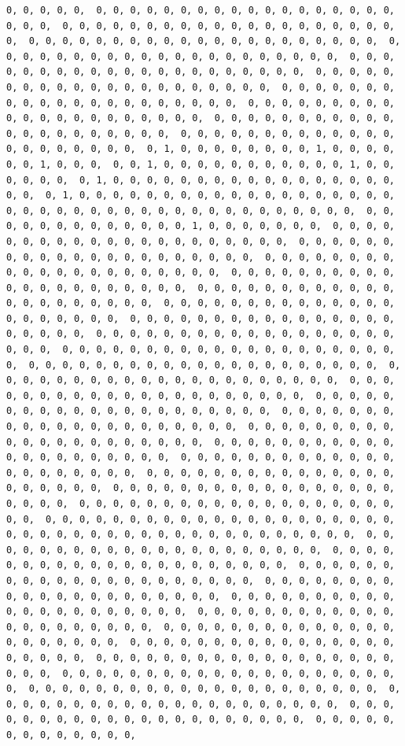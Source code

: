 \documentclass[
]{article}
\begin{document}
\begin{verbatim}
0, 0, 0, 0, 0,  0, 0, 0, 0, 0, 0, 0, 0, 0, 0, 0, 0, 0, 0, 0, 0, 0, 0, 0, 0, 0,  0, 0, 0, 0, 0, 0, 0, 0, 0, 0, 0, 0, 0, 0, 0, 0, 0, 0, 0, 0, 0,  0, 0, 0, 0, 0, 0, 0, 0, 0, 0, 0, 0, 0, 0, 0, 0, 0, 0, 0, 0, 0,  0, 0, 0, 0, 0, 0, 0, 0, 0, 0, 0, 0, 0, 0, 0, 0, 0, 0, 0, 0, 0,  0, 0, 0, 0, 0, 0, 0, 0, 0, 0, 0, 0, 0, 0, 0, 0, 0, 0, 0, 0, 0,  0, 0, 0, 0, 0, 0, 0, 0, 0, 0, 0, 0, 0, 0, 0, 0, 0, 0, 0, 0, 0,  0, 0, 0, 0, 0, 0, 0, 0, 0, 0, 0, 0, 0, 0, 0, 0, 0, 0, 0, 0, 0,  0, 0, 0, 0, 0, 0, 0, 0, 0, 0, 0, 0, 0, 0, 0, 0, 0, 0, 0, 0, 0,  0, 0, 0, 0, 0, 0, 0, 0, 0, 0, 0, 0, 0, 0, 0, 0, 0, 0, 0, 0, 0,  0, 0, 0, 0, 0, 0, 0, 0, 0, 0, 0, 0, 0, 0, 0, 0, 0, 0, 0, 0, 0,  0, 1, 0, 0, 0, 0, 0, 0, 0, 0, 1, 0, 0, 0, 0, 0, 0, 1, 0, 0, 0,  0, 0, 1, 0, 0, 0, 0, 0, 0, 0, 0, 0, 0, 0, 1, 0, 0, 0, 0, 0, 0,  0, 1, 0, 0, 0, 0, 0, 0, 0, 0, 0, 0, 0, 0, 0, 0, 0, 0, 0, 0, 0,  0, 1, 0, 0, 0, 0, 0, 0, 0, 0, 0, 0, 0, 0, 0, 0, 0, 0, 0, 0, 0,  0, 0, 0, 0, 0, 0, 0, 0, 0, 0, 0, 0, 0, 0, 0, 0, 0, 0, 0, 0, 0,  0, 0, 0, 0, 0, 0, 0, 0, 0, 0, 0, 0, 0, 1, 0, 0, 0, 0, 0, 0, 0,  0, 0, 0, 0, 0, 0, 0, 0, 0, 0, 0, 0, 0, 0, 0, 0, 0, 0, 0, 0, 0,  0, 0, 0, 0, 0, 0, 0, 0, 0, 0, 0, 0, 0, 0, 0, 0, 0, 0, 0, 0, 0,  0, 0, 0, 0, 0, 0, 0, 0, 0, 0, 0, 0, 0, 0, 0, 0, 0, 0, 0, 0, 0,  0, 0, 0, 0, 0, 0, 0, 0, 0, 0, 0, 0, 0, 0, 0, 0, 0, 0, 0, 0, 0,  0, 0, 0, 0, 0, 0, 0, 0, 0, 0, 0, 0, 0, 0, 0, 0, 0, 0, 0, 0, 0,  0, 0, 0, 0, 0, 0, 0, 0, 0, 0, 0, 0, 0, 0, 0, 0, 0, 0, 0, 0, 0,  0, 0, 0, 0, 0, 0, 0, 0, 0, 0, 0, 0, 0, 0, 0, 0, 0, 0, 0, 0, 0,  0, 0, 0, 0, 0, 0, 0, 0, 0, 0, 0, 0, 0, 0, 0, 0, 0, 0, 0, 0, 0,  0, 0, 0, 0, 0, 0, 0, 0, 0, 0, 0, 0, 0, 0, 0, 0, 0, 0, 0, 0, 0,  0, 0, 0, 0, 0, 0, 0, 0, 0, 0, 0, 0, 0, 0, 0, 0, 0, 0, 0, 0, 0,  0, 0, 0, 0, 0, 0, 0, 0, 0, 0, 0, 0, 0, 0, 0, 0, 0, 0, 0, 0, 0,  0, 0, 0, 0, 0, 0, 0, 0, 0, 0, 0, 0, 0, 0, 0, 0, 0, 0, 0, 0, 0,  0, 0, 0, 0, 0, 0, 0, 0, 0, 0, 0, 0, 0, 0, 0, 0, 0, 0, 0, 0, 0,  0, 0, 0, 0, 0, 0, 0, 0, 0, 0, 0, 0, 0, 0, 0, 0, 0, 0, 0, 0, 0,  0, 0, 0, 0, 0, 0, 0, 0, 0, 0, 0, 0, 0, 0, 0, 0, 0, 0, 0, 0, 0,  0, 0, 0, 0, 0, 0, 0, 0, 0, 0, 0, 0, 0, 0, 0, 0, 0, 0, 0, 0, 0,  0, 0, 0, 0, 0, 0, 0, 0, 0, 0, 0, 0, 0, 0, 0, 0, 0, 0, 0, 0, 0,  0, 0, 0, 0, 0, 0, 0, 0, 0, 0, 0, 0, 0, 0, 0, 0, 0, 0, 0, 0, 0,  0, 0, 0, 0, 0, 0, 0, 0, 0, 0, 0, 0, 0, 0, 0, 0, 0, 0, 0, 0, 0,  0, 0, 0, 0, 0, 0, 0, 0, 0, 0, 0, 0, 0, 0, 0, 0, 0, 0, 0, 0, 0,  0, 0, 0, 0, 0, 0, 0, 0, 0, 0, 0, 0, 0, 0, 0, 0, 0, 0, 0, 0, 0,  0, 0, 0, 0, 0, 0, 0, 0, 0, 0, 0, 0, 0, 0, 0, 0, 0, 0, 0, 0, 0,  0, 0, 0, 0, 0, 0, 0, 0, 0, 0, 0, 0, 0, 0, 0, 0, 0, 0, 0, 0, 0,  0, 0, 0, 0, 0, 0, 0, 0, 0, 0, 0, 0, 0, 0, 0, 0, 0, 0, 0, 0, 0,  0, 0, 0, 0, 0, 0, 0, 0, 0, 0, 0, 0, 0, 0, 0, 0, 0, 0, 0, 0, 0,  0, 0, 0, 0, 0, 0, 0, 0, 0, 0, 0, 0, 0, 0, 0, 0, 0, 0, 0, 0, 0,  0, 0, 0, 0, 0, 0, 0, 0, 0, 0, 0, 0, 0, 0, 0, 0, 0, 0, 0, 0, 0,  0, 0, 0, 0, 0, 0, 0, 0, 0, 0, 0, 0, 0, 0, 0, 0, 0, 0, 0, 0, 0,  0, 0, 0, 0, 0, 0, 0, 0, 0, 0, 0, 0, 0, 0, 0, 0, 0, 0, 0, 0, 0,  0, 0, 0, 0, 0, 0, 0, 0, 0, 0, 0, 0, 0, 0, 0, 0, 0, 0, 0, 0, 0,  0, 0, 0, 0, 0, 0, 0, 0, 0, 0, 0, 0, 0, 0, 0, 0, 0, 0, 0, 0, 0,  0, 0, 0, 0, 0, 0, 0, 0, 0, 0, 0, 0, 0, 0, 0, 0, 0, 0, 0, 0, 0,  0, 0, 0, 0, 0, 0, 0, 0, 0, 0, 0, 0, 0, 0, 0, 0, 0, 0, 0, 0, 0,  0, 0, 0, 0, 0, 0, 0, 0, 0, 0, 0, 0, 0, 0, 0, 0, 0, 0, 0, 0, 0,  0, 0, 0, 0, 0, 0, 0, 0, 0, 0, 0, 0, 0, 0, 0, 0, 0, 0, 0, 0, 0,  0, 0, 0, 0, 0, 0, 0, 0, 0, 0, 0, 0, 0, 
\end{verbatim}
\end{document}
